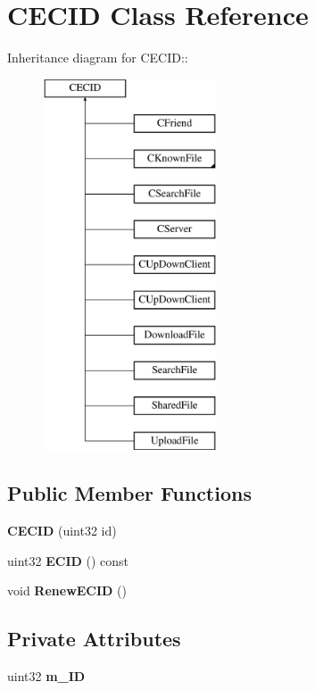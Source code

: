 \section{CECID Class Reference}
\label{classCECID}
Inheritance diagram for CECID::\begin{figure}[H]
\begin{center}
\leavevmode
\includegraphics[height=11cm]{classCECID}
\end{center}
\end{figure}
\subsection*{Public Member Functions}
\begin{DoxyCompactItemize}
\item 
{\bfseries CECID} (uint32 id)\label{classCECID_a7eacca54efa0314e2f0519dfb617a1b4}

\item 
uint32 {\bfseries ECID} () const \label{classCECID_aad3dae3fdb8eeb86ba6487608edc0cee}

\item 
void {\bfseries RenewECID} ()\label{classCECID_a944bd5b68b74943e01f338300509c22b}

\end{DoxyCompactItemize}
\subsection*{Private Attributes}
\begin{DoxyCompactItemize}
\item 
uint32 {\bfseries m\_\-ID}\label{classCECID_a8842e10f1316a671d1d16c27c66bdee5}

\end{DoxyCompactItemize}
